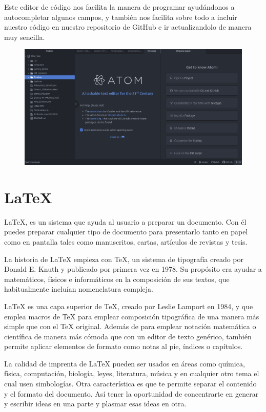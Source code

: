 \documentclass[a4paper, 12pt]{book}
\begin{document}
Este editor de código nos facilita la manera de programar ayudándonos a autocompletar algunos campos, y también nos facilita sobre todo a incluir nuestro código en nuestro repositorio de GitHub e ir actualizandolo de manera muy sencilla.

\begin{figure}[h]
\centering
 \includegraphics[scale=0.35]{img/github.png}
\end{figure}


\newpage
\section{LaTeX} 
\label{sec:LaTeX}


LaTeX, es un sistema que ayuda al usuario a preparar un documento. Con él puedes preparar cualquier tipo de documento para presentarlo tanto en papel como en pantalla tales como manuscritos, cartas, artículos de revistas y tesis.

La historia de LaTeX empieza con TeX, un sistema de tipografía creado por Donald E. Knuth y publicado por primera vez en 1978. Su propósito era ayudar a matemáticos, físicos e informáticos en la composición de sus textos, que habitualmente incluían nomenclatura compleja.

LaTeX es una capa superior de TeX, creado por Leslie Lamport en 1984, y que emplea macros de TeX para emplear composición tipográfica de una manera más simple que con el TeX original. 
Además de para emplear notación matemática o científica de manera más cómoda que con un editor de texto genérico, también permite aplicar elementos de formato como notas al pie, índices o capítulos.

La calidad de imprenta de LaTeX pueden ser usados en áreas como química, física, computación, biología, leyes, literatura, música y en cualquier otro tema el cual usen simbologías.
Otra característica es que te permite separar el contenido y el formato del documento. Así tener la oportunidad de concentrarte en generar y escribir ideas en una parte y plasmar esas ideas en otra.
\end{document}
